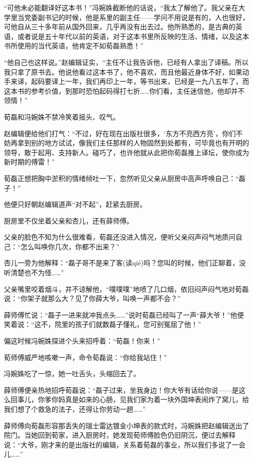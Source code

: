 \par “可他未必能翻译好这本书！”冯婉姝截断他的话说，“我太了解他了。我父亲在大学里当党委副书记的时候，他是系里的副主任——学问不用说是有的，人也很好，可他自从三十多年前从国外回来，几乎再没有出去过。他所熟悉的，是古典的英语，或者说是五十年代以前的英语，对于这本书里所反映的生活、情绪，以及这本书所使用的当代英语，他肯定不如荀磊熟悉！”
\par “他自己也这样说。”赵编辑证实，“主任不让我告诉他，已经有人拿出了译稿。所以我只拿了原书去。他说他看过这本书了，他不喜欢，而且他最近身体不好，如果动手来译，起码要译上一年，我们再印上一年，等书出来，已经是一九八五年了，而这本书的参考价值，到那时恐怕起码得打七折……你们看，主任迷信他，他却并不领情！”
\par 荀磊和冯婉姝不禁冷笑着摇头、叹气。
\par 赵编辑便给他们打气：“不过，好在现在出版社很多，‘东方不亮西方亮’，你们不妨再拿到别的地方试试，像我们主任那样的人物固然到处都有，可毕竟也有开明的领导，敢于起用、支持新人。碰巧了，也许他就从此把你荀磊推上译坛，使你成为新时期的傅雷！”
\par 荀磊正想把胸中淤积的情绪倾吐一下，忽然听见父亲从厨房中高声呼唤自己：“磊子！”
\par 他便只好朝赵编辑道声“对不起”，赶紧去厨房。
\par 厨房里不仅坐着父亲和杏儿，还有薛师傅。
\par 父亲的脸色不知为什么很难看，荀磊还没进入情况，便听父亲闷声闷气地质问自己：“怎么叫唤你几次，你都不出来？”
\par 杏儿一旁为他解释：“磊子哥不是来了客(读qié)吗？您叫的时候，他们正聊着，没听清楚也不为怪……”
\par 父亲嘴里咬着烟斗，并不谅解他，“噗噗噗”地喷了几口烟，依旧闷声闷气地对荀磊说：“你架子就那么大？见了你薛大爷，叫唤一声都不会？”
\par 薛师傅忙说：“磊子一进来就冲我点头……”说时荀磊已经叫了一声“薛大爷！”他便笑着说：“这不，院里的孩子们就数磊子懂礼，您可别冤屈了他！”
\par 偏这时候冯婉姝探进个头来招呼着：“荀磊！你来！”
\par 荀师傅威严地咳嗽一声，命令荀磊说：“你给我站住！”
\par 冯婉姝吃了一惊，她一吐舌头，头缩回去了。
\par 薛师傅便亲热地招呼荀磊说：“磊子过来，坐我身边！你大爷有话给你说——是这么回事儿，你爹你妈真是如来的心肠，见我们家为着一块外国坤表闹炸了窝儿，给我们想了个救急的法子，还得让你劳动一趟……”
\par 薛师傅向荀磊形容那丢失的瑞士雷达镀金小坤表的款式时，冯婉姝把赵编辑送出了院门。当她回到荀家，进入厨房时，她发现荀师傅脸色仍旧阴沉，便过去解释说：“大爷，刚才来的是出版社的编辑，关系着荀磊的事业，所以我们多说了一会儿……”
